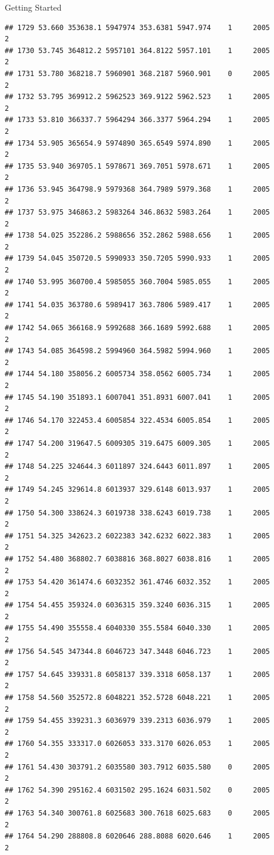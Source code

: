 \documentclass[
  ignorenonframetext,
]{beamer}
\begin{document}
\begin{frame}[fragile]{Getting Started}
\begin{verbatim}
## 1729 53.660 353638.1 5947974 353.6381 5947.974    1     2005        2
## 1730 53.745 364812.2 5957101 364.8122 5957.101    1     2005        2
## 1731 53.780 368218.7 5960901 368.2187 5960.901    0     2005        2
## 1732 53.795 369912.2 5962523 369.9122 5962.523    1     2005        2
## 1733 53.810 366337.7 5964294 366.3377 5964.294    1     2005        2
## 1734 53.905 365654.9 5974890 365.6549 5974.890    1     2005        2
## 1735 53.940 369705.1 5978671 369.7051 5978.671    1     2005        2
## 1736 53.945 364798.9 5979368 364.7989 5979.368    1     2005        2
## 1737 53.975 346863.2 5983264 346.8632 5983.264    1     2005        2
## 1738 54.025 352286.2 5988656 352.2862 5988.656    1     2005        2
## 1739 54.045 350720.5 5990933 350.7205 5990.933    1     2005        2
## 1740 53.995 360700.4 5985055 360.7004 5985.055    1     2005        2
## 1741 54.035 363780.6 5989417 363.7806 5989.417    1     2005        2
## 1742 54.065 366168.9 5992688 366.1689 5992.688    1     2005        2
## 1743 54.085 364598.2 5994960 364.5982 5994.960    1     2005        2
## 1744 54.180 358056.2 6005734 358.0562 6005.734    1     2005        2
## 1745 54.190 351893.1 6007041 351.8931 6007.041    1     2005        2
## 1746 54.170 322453.4 6005854 322.4534 6005.854    1     2005        2
## 1747 54.200 319647.5 6009305 319.6475 6009.305    1     2005        2
## 1748 54.225 324644.3 6011897 324.6443 6011.897    1     2005        2
## 1749 54.245 329614.8 6013937 329.6148 6013.937    1     2005        2
## 1750 54.300 338624.3 6019738 338.6243 6019.738    1     2005        2
## 1751 54.325 342623.2 6022383 342.6232 6022.383    1     2005        2
## 1752 54.480 368802.7 6038816 368.8027 6038.816    1     2005        2
## 1753 54.420 361474.6 6032352 361.4746 6032.352    1     2005        2
## 1754 54.455 359324.0 6036315 359.3240 6036.315    1     2005        2
## 1755 54.490 355558.4 6040330 355.5584 6040.330    1     2005        2
## 1756 54.545 347344.8 6046723 347.3448 6046.723    1     2005        2
## 1757 54.645 339331.8 6058137 339.3318 6058.137    1     2005        2
## 1758 54.560 352572.8 6048221 352.5728 6048.221    1     2005        2
## 1759 54.455 339231.3 6036979 339.2313 6036.979    1     2005        2
## 1760 54.355 333317.0 6026053 333.3170 6026.053    1     2005        2
## 1761 54.430 303791.2 6035580 303.7912 6035.580    0     2005        2
## 1762 54.390 295162.4 6031502 295.1624 6031.502    0     2005        2
## 1763 54.340 300761.8 6025683 300.7618 6025.683    0     2005        2
## 1764 54.290 288808.8 6020646 288.8088 6020.646    1     2005        2

\end{verbatim}
\end{frame}
\end{document}
